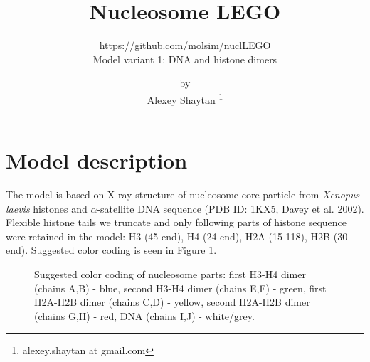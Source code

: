 \documentclass[12pt,onecolumn]{scrartcl}
\title{Nucleosome LEGO} %
\subtitle{\url{https://github.com/molsim/nuclLEGO} \\ Model variant 1: DNA and histone dimers }
\author{by \\ Alexey Shaytan \footnote{alexey.shaytan at gmail.com}} %
\date{} %
\begin{document}
\maketitle %




\section{Model description}
The model is based on X-ray structure of nucleosome core particle from \textit{Xenopus laevis} histones and $\alpha$-satellite DNA sequence (PDB ID: 1KX5, Davey et al. 2002). Flexible histone tails we truncate and only following parts of histone sequence were retained in the model: H3 (45-end), H4 (24-end), H2A (15-118), H2B (30-end). Suggested color coding is seen in Figure \ref{colorcode}.

\begin{figure}[h]
\begin{center}
\caption{Suggested color coding of nucleosome parts: first H3-H4 dimer (chains A,B) - blue, second H3-H4 dimer (chains E,F) - green, first H2A-H2B dimer (chains C,D) - yellow, second H2A-H2B dimer (chains G,H) - red, DNA (chains I,J) - white/grey.}
\label{colorcode}
\end{center}
\end{figure}
\end{document}
